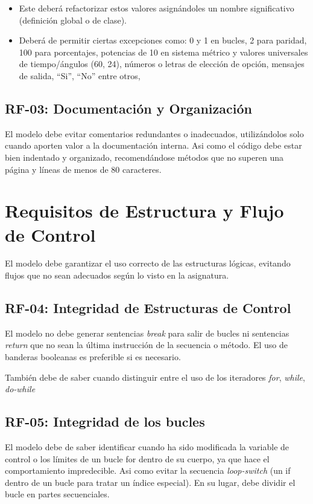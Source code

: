 \begin{itemize}
    \item Este deberá refactorizar estos valores asignándoles un nombre significativo (definición global o de clase).
    
    \item Deberá de permitir ciertas excepciones como: 0 y 1 en bucles, 2 para paridad, 100 para porcentajes, potencias de 10 en sistema métrico y valores universales de tiempo/ángulos (60, 24), números o letras de elección de opción, mensajes de salida, “Si”, “No” entre otros,
\end{itemize}

\subsection{RF-03: Documentación y Organización}
El modelo debe evitar comentarios redundantes o inadecuados, utilizándolos solo cuando aporten valor a la documentación interna. Asi como el código debe estar bien indentado y organizado, recomendándose métodos que no superen una página y líneas de menos de 80 caracteres.

\section{Requisitos de Estructura y Flujo de Control}
El modelo debe garantizar el uso correcto de las estructuras lógicas, evitando flujos que no sean adecuados según lo visto en la asignatura.
\subsection{RF-04: Integridad de Estructuras de Control}
El modelo no debe generar sentencias \textit{break} para salir de bucles ni sentencias \textit{return} que no sean la última instrucción de la secuencia o método. El uso de banderas booleanas es preferible si es necesario.

También debe de saber cuando distinguir entre el uso de los iteradores \textit{for}, \textit{while}, \textit{do-while}

\subsection{RF-05: Integridad de los bucles}
El modelo debe de saber identificar cuando ha sido modificada la variable de control o los límites de un bucle for dentro de su cuerpo, ya que hace el comportamiento impredecible. Asi como  evitar la secuencia \textit{loop-switch} (un if dentro de un bucle para tratar un índice especial). En su lugar, debe dividir el bucle en partes secuenciales.

